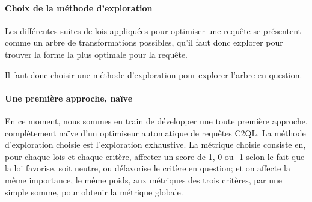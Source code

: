 \paragraph{Choix de la méthode d'exploration}
Les différentes suites de lois appliquées
pour optimiser une requête se présentent comme
un arbre de transformations possibles, qu'il faut donc
explorer pour trouver la forme la plus optimale
pour la requête.

Il faut donc choisir une méthode d'exploration
pour explorer l'arbre en question.

\paragraph{Une première approche, naïve}
En ce moment, nous sommes en train de développer
une toute première approche, complètement naïve
d'un optimiseur automatique de requêtes C2QL.
La méthode d'exploration choisie est l'exploration
exhaustive. La métrique choisie consiste en,
pour chaque lois et chaque critère, affecter un score
de 1, 0 ou -1 selon le fait que la loi favorise,
soit neutre, ou défavorise le critère en question;
et on affecte la même importance, le même poids,
aux métriques des trois critères, par une simple somme,
pour obtenir la métrique globale.